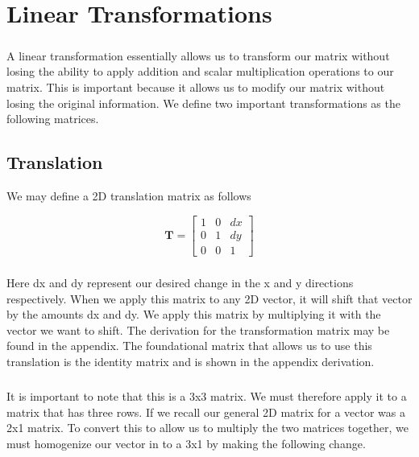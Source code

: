 \documentclass[12pt, letterpaper]{report}
\begin{document}
\chapter{Linear Transformations}	
	\paragraph{}A linear transformation essentially allows us to transform our matrix without losing the ability to apply addition and scalar multiplication operations to our matrix. This is important because it allows us to modify our matrix without losing the original information. We define two important transformations as the following matrices.

	\section{Translation}
	We may define a 2D translation matrix as follows

	\begin{equation}
	\mathbf
	T = 
	\begin{bmatrix}
	1 & 0 & dx\\
	0 & 1 & dy\\
	0 & 0 & 1
	\end{bmatrix}
	\end{equation}

	\paragraph{} Here dx and dy represent our desired change in the x and y directions respectively. When we apply this matrix to any 2D vector, it will shift that vector by the amounts dx and dy. We apply this matrix by multiplying it with the vector we want to shift. The derivation for the transformation matrix may be found in the appendix. The foundational matrix that allows us to use this translation is the identity matrix and is shown in the appendix derivation.

	\paragraph{} It is important to note that this is a 3x3 matrix. We must therefore apply it to a matrix that has three rows. If we recall our general 2D matrix for a vector was a 2x1 matrix. To convert this to allow us to multiply the two matrices together, we must homogenize our vector in to a 3x1 by making the following change.
	
\end{document}
